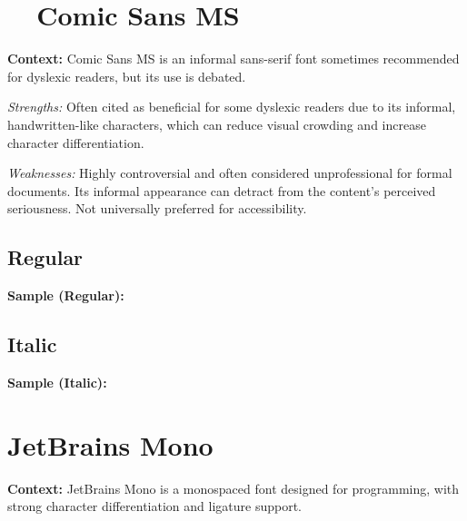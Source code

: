 \pagebreak
\section{~~Comic Sans MS}\label{app5:trouble9}
\noindent
\textbf{Context:} Comic Sans MS is an informal sans-serif font sometimes recommended for dyslexic readers, but its use is debated.

\begin{raggedright}
	\emph{Strengths:} Often cited as beneficial for some dyslexic readers due to its informal, handwritten-like characters, which can reduce visual crowding and increase character differentiation.

	\emph{Weaknesses:} Highly controversial and often considered unprofessional for formal documents. Its informal appearance can detract from the content's perceived seriousness. Not universally preferred for accessibility.

	\subsection{Regular}
	\noindent\textbf{Sample (Regular):}
	\FontSample{\comicsansfont}

	\subsection{Italic}
	\noindent\textbf{Sample (Italic):}
	\FontSample{{\comicsansfont\itshape}}
\end{raggedright}


\pagebreak
\hypertarget{trouble10}{}\section[JetBrains Mono]{JetBrains Mono \supercite{JetBrainsMono}}\label{app5:trouble10}
\noindent
\textbf{Context:} JetBrains Mono is a monospaced font designed for programming, with strong character differentiation and ligature support.

